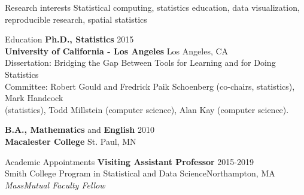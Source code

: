 \documentclass{resume} %
\begin{document}
\begin{rSection}{Research interests}
Statistical computing, statistics education, data visualization, reproducible research, spatial statistics
\end{rSection}


\begin{rSection}{Education}
{\bf Ph.D., Statistics} \hfill 2015\\ 
{\bf University of California - Los Angeles} \hfill Los Angeles, CA \\
{Dissertation: Bridging the Gap Between Tools for Learning and for Doing Statistics} \\
{Committee: Robert Gould and Fredrick Paik Schoenberg (co-chairs, statistics), Mark Handcock \\(statistics), Todd Millstein (computer science), Alan Kay (computer science).} \smallskip 

{\bf B.A., Mathematics} and {\bf English}  \hfill  2010 \\
{\bf Macalester College} \hfill St. Paul, MN\smallskip 
\end{rSection}



\begin{rSection}{Academic Appointments}
{\bf Visiting Assistant Professor} \hfill {2015-2019} \\
{Smith College Program in Statistical and Data Science}\hfill {Northampton, MA} \\
\emph{MassMutual Faculty Fellow} 
\end{rSection}



\end{document}

